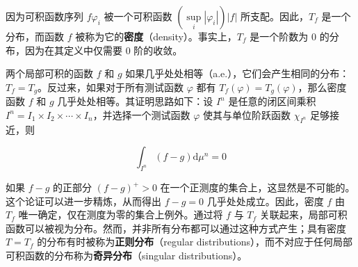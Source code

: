 因为可积函数序列 \(f\varphi_{i}\) 被一个可积函数
\(\left( \sup\limits_{i}\left| \varphi_{i} \right| \right)|f|\)
所支配。因此，\(T_{f}\) 是一个分布，而函数 \(f\)
被称为它的\textbf{密度}（density）。事实上，\(T_{f}\) 是一个阶数为 0
的分布，因为在其定义中仅需要 0 阶的收敛。

两个局部可积的函数 \(f\) 和 \(g\)
如果几乎处处相等（a.e.），它们会产生相同的分布：\(T_{f} = T_{g}\)。反过来，如果对于所有测试函数
\(\varphi\) 都有 \(T_{f}(\varphi) = T_{g}(\varphi)\)，那么密度函数 \(f\)
和 \(g\) 几乎处处相等。其证明思路如下：设 \(I^{n}\) 是任意的闭区间乘积
\(I^{n} = I_{1} \times I_{2} \times \cdots \times I_{n}\)，并选择一个测试函数
\(\varphi\) 使其与单位阶跃函数 \(\chi_{I^{n}}\) 足够接近，则

\[\int_{I^{n}}(f - g)\mathrm{d}\mu^{n} = 0\]

如果 \(f - g\) 的正部分 \((f - g)^{+} > 0\)
在一个正测度的集合上，这显然是不可能的。这个论证可以进一步精炼，从而得出
\(f - g = 0\) 几乎处处成立。因此，密度 \(f\) 由 \(T_{f}\)
唯一确定，仅在测度为零的集合上例外。通过将 \(f\) 与 \(T_{f}\)
关联起来，局部可积函数可以被视为分布。然而，并非所有分布都可以通过这种方式产生；具有密度
\(T = T_{f}\) 的分布有时被称为\textbf{正则分布}（regular
distributions），而不对应于任何局部可积函数的分布称为\textbf{奇异分布}（singular
distributions）。

